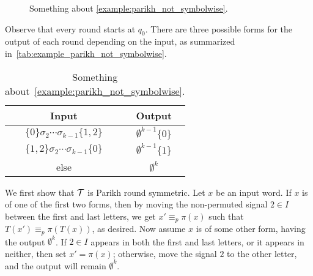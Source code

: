 \begin{example}
\begin{figure}[ht]
	\caption{Something about \autoref{example:parikh_not_symbolwise}.}
	\label{fig:example_parikh_not_symbolwise}
\end{figure}

Observe that every round starts at $q_0$. There are three possible forms for the output of each round depending on the input, as summarized in~\autoref{tab:example_parikh_not_symbolwise}.

\begin{table}[!htb]
    \centering
    \caption{Something about~\autoref{example:parikh_not_symbolwise}.}
    \vspace{2mm}
    \def\arraystretch{1.3}
    \begin{tabular}{c|c}
        Input & Output \\
        \hline \hline
        $\{0\}\sigma_2\cdots \sigma_{k-1}\{1,2\}$ & $\emptyset^{k-1} \{0\}$ \\
        \hline
        $\{1,2\}\sigma_2\cdots \sigma_{k-1}\{0\}$ & $\emptyset^{k-1} \{1\}$ \\
        \hline
        else & $\emptyset^k$ \\
    \end{tabular}
    \label{tab:example_parikh_not_symbolwise}
\end{table}

We first show that $\mathcal{T}$ is Parikh round symmetric. Let $x$ be an input word. If $x$ is of one of the first two forms, then by moving the non-permuted signal $2\in I$ between the first and last letters, we get $x'\equiv_p \pi(x)$ such that $T(x')\equiv_p\pi(T(x))$, as desired. Now assume $x$ is of some other form, having the output $\emptyset^k$. If $2\in I$ appears in both the first and last letters, or it appears in neither, then set $x'=\pi(x)$; otherwise, move the signal $2$ to the other letter, and the output will remain $\emptyset^k$.


\end{example}
